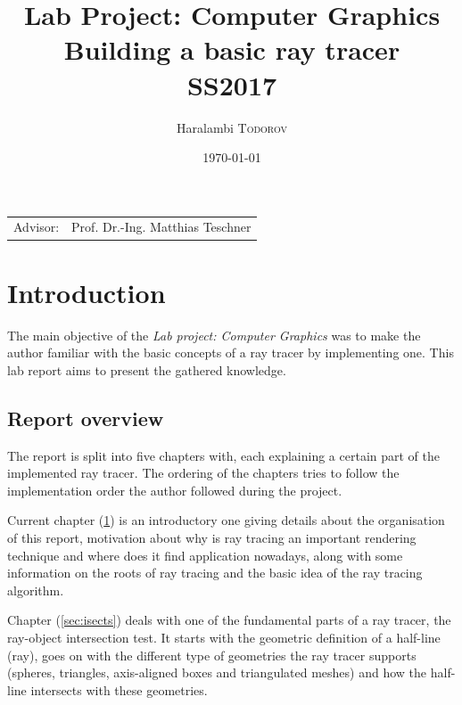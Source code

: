 \documentclass{article}
\title{Lab Project: Computer Graphics \\ Building a basic ray tracer \\ SS2017} %
\author{Haralambi \textsc{Todorov}} %
\date{\today} %
\begin{document}
\maketitle %

\begin{center}
\begin{tabular}{l r}
Advisor: & Prof. Dr.-Ing. Matthias Teschner %
\end{tabular}
\end{center}



\section{Introduction}
\label{sec:intro}
The main objective of the \textit{Lab project: Computer Graphics} was to make the author familiar with the basic concepts of a ray tracer by implementing one. This lab report aims to present the gathered knowledge.

\subsection{Report overview}
The report is split into five chapters with, each explaining a certain part of the implemented ray tracer. The ordering of the chapters tries to follow the implementation order the author followed during the project. 

\vspace*{\baselineskip}

Current chapter (\ref{sec:intro}) is an introductory one giving details about the organisation of this report, motivation about why is ray tracing an important rendering technique and where does it find application nowadays, along with some information on the roots of ray tracing and the basic idea of the ray tracing algorithm.

\vspace*{\baselineskip}

Chapter (\ref{sec:isects}) deals with one of the fundamental parts of a ray tracer, the ray-object intersection test. It starts with the geometric definition of a half-line (ray), goes on with the different type of geometries the ray tracer supports (spheres, triangles, axis-aligned boxes and triangulated meshes) and how the half-line intersects with these geometries.
\end{document}
